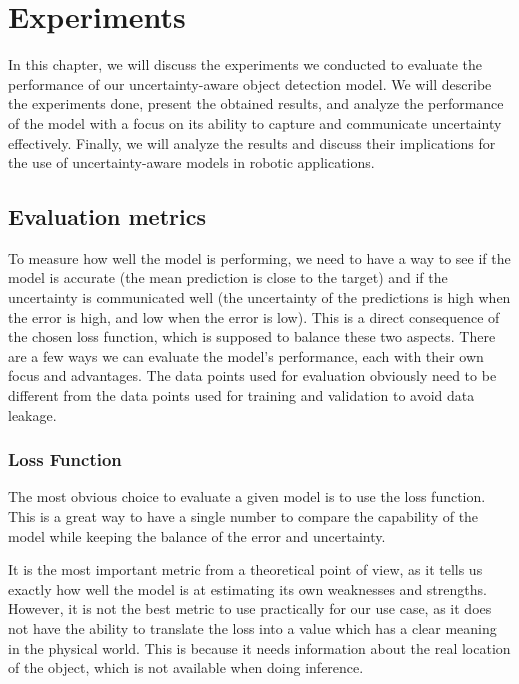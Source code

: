 
\chapter{Experiments}\label{ch:experiments}
In this chapter, we will discuss the experiments we conducted to evaluate the performance of our uncertainty-aware object detection model. 
We will describe the experiments done, present the obtained results, and analyze the performance of the model with a focus on its ability to capture and communicate uncertainty effectively.
Finally, we will analyze the results and discuss their implications for the use of uncertainty-aware models in robotic applications.

\section{Evaluation metrics}\label{ch:experiments_section:evaluation-metrics}
To measure how well the model is performing, we need to have a way to see if the model is accurate (the mean prediction is close to the target) and if the uncertainty is communicated well (the uncertainty of the predictions is high when the error is high, and low when the error is low).
This is a direct consequence of the chosen loss function, which is supposed to balance these two aspects.
There are a few ways we can evaluate the model's performance, each with their own focus and advantages.
The data points used for evaluation obviously need to be different from the data points used for training and validation to avoid data leakage.

\subsection{Loss Function}\label{ch:experiments_section:evaluation-metrics_subsection:loss-function}
The most obvious choice to evaluate a given model is to use the loss function.
This is a great way to have a single number to compare the capability of the model while keeping the balance of the error and uncertainty.

It is the most important metric from a theoretical point of view, as it tells us exactly how well the model is at estimating its own weaknesses and strengths.
However, it is not the best metric to use practically for our use case, as it does not have the ability to translate the loss into a value which has a clear meaning in the physical world.
This is because it needs information about the real location of the object, which is not available when doing inference.

